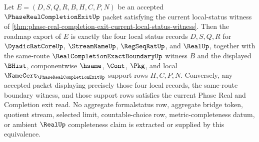 \begin{theorem}
\label{thm:phase-real-completion-exit-component-status-extraction}
Let $E=(D,S,Q,R,B,H,C,P,N)$ be an accepted $\PhaseRealCompletionExitUp$ packet satisfying the current local-status witness of \autoref{thm:phase-real-completion-exit-current-local-status-witness}. Then the roadmap export of $E$ is exactly the four local status records $D,S,Q,R$ for $\DyadicRatCoreUp$, $\StreamNameUp$, $\RegSeqRatUp$, and $\RealUp$, together with the same-route $\RealCompletionExactBoundaryUp$ witness $B$ and the displayed $\BHist$, componentwise $\hsame$, $\Cont$, $\Pkg$, and local $\NameCert_{\PhaseRealCompletionExitUp}$ support rows $H,C,P,N$. Conversely, any accepted packet displaying precisely those four local records, the same-route boundary witness, and those support rows satisfies the current Phase Real and Completion exit read. No aggregate formalstatus row, aggregate bridge token, quotient stream, selected limit, countable-choice row, metric-completeness datum, or ambient $\RealUp$ completeness claim is extracted or supplied by this equivalence.
\end{theorem}

